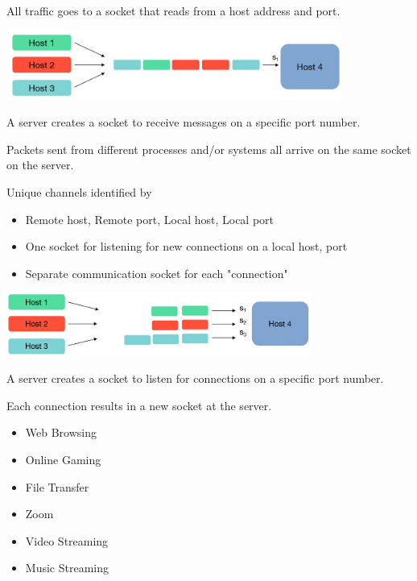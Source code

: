 \begin{slide}

	
	All traffic goes to a socket that reads from a host address and port.
	\bigskip
	
	\includegraphics[width=110mm]{udp.png}
	\bigskip
	
	A server creates a socket to receive messages on a specific port number. 
	\bigskip
	
	Packets sent from different processes and/or systems all arrive on the same socket on the server.
	
\end{slide}

\begin{slide}


	Unique channels identified by
	\begin{itemize}
		\item {Remote host, Remote port, Local host, Local port}
		\item One socket for listening for new connections on a local host, port
		\item Separate communication socket for each "connection"
	\end{itemize}
	\bigskip
	
    \includegraphics[width=100mm]{tcp.png}
	\bigskip
	
	A server creates a socket to listen for connections on a specific port number.
	\bigskip
	
	Each connection results in a new socket at the server.

\end{slide}

\begin{slide}

	
	\begin{itemize}
		\item Web Browsing
		\item Online Gaming
		\item File Transfer
		\item Zoom
		\item Video Streaming
		\item Music Streaming
	\end{itemize}
	
\end{slide}

